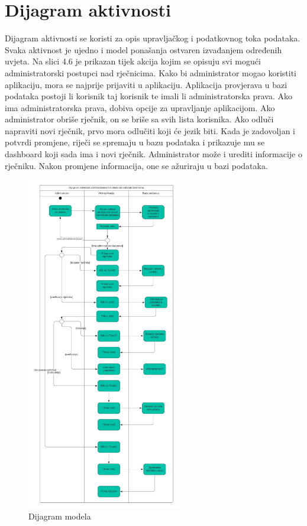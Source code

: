 		\section{Dijagram aktivnosti}
        Dijagram aktivnosti se koristi za opis upravljačkog i podatkovnog toka podataka. Svaka aktivnost je ujedno i model ponašanja ostvaren izvađanjem određenih uvjeta. Na slici 4.6 je prikazan tijek akcija kojim se opisuju svi mogući administratorski postupci nad rječnicima.
        Kako bi administrator mogao koristiti aplikaciju, mora se najprije prijaviti u aplikaciju. Aplikacija provjerava u bazi podataka postoji li korisnik taj korisnik te imali li administratorska prava.
        Ako ima administratorska prava, dobiva opcije za upravljanje aplikacijom. Ako administrator obriše rječnik, on se briše sa svih lista korisnika. Ako odluči napraviti novi rječnik, prvo mora odlučiti koji će jezik biti. Kada je zadovoljan i potvrdi promjene, riječi se spremaju u bazu podataka i prikazuje mu se dashboard koji sada ima i novi rječnik. Administrator može i urediti informacije o rječniku. Nakon promjene informacija, one se ažuriraju u bazi podataka.
        \begin{figure}[H]
            \includegraphics[width=0.6\textwidth]{dijagrami/Dijagram Aktivnosti.png} 
            \centering
            \caption{Dijagram modela}
            \label{fig:class_diagram}
        \end{figure}	

